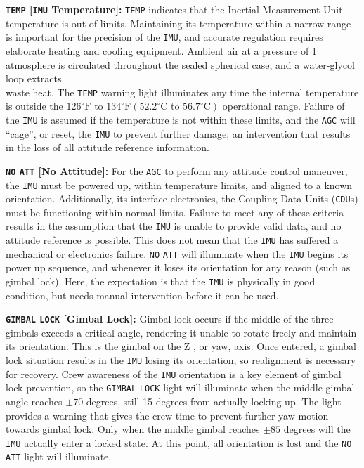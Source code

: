 \documentclass[refcap, oxford]{ahsan}
\begin{document}
\textbf{\texttt{TEMP} [\texttt{IMU} Temperature]:} \texttt{TEMP} indicates that the Inertial Measurement Unit temperature is out of limits. Maintaining its temperature within a narrow range is important for the precision of the \texttt{IMU}, and accurate regulation requires elaborate heating and cooling equipment. Ambient air at a pressure of 1 atmosphere is circulated throughout the sealed spherical case, and a water-glycol loop extracts\\
waste heat. The \texttt{TEMP} warning light illuminates any time the internal temperature is outside the $126^{\circ} \mathrm{F}$ to $134^{\circ} \mathrm{F}\left(52.2^{\circ} \mathrm{C}\right.$ to $\left.56.7^{\circ} \mathrm{C}\right)$ operational range. Failure of the \texttt{IMU} is assumed if the temperature is not within these limits, and the \texttt{AGC} will ``cage'', or reset, the \texttt{IMU} to prevent further damage; an intervention that results in the loss of all attitude reference information.

\textbf{\texttt{NO} \texttt{ATT} [No Attitude]:} For the \texttt{AGC} to perform any attitude control maneuver, the \texttt{IMU} must be powered up, within temperature limits, and aligned to a known orientation. Additionally, its interface electronics, the Coupling Data Units (\texttt{CDU}s) must be functioning within normal limits. Failure to meet any of these criteria results in the assumption that the \texttt{IMU} is unable to provide valid data, and no attitude reference is possible. This does not mean that the \texttt{IMU} has suffered a mechanical or electronics failure. \texttt{NO} \texttt{ATT} will illuminate when the \texttt{IMU} begins its power up sequence, and whenever it loses its orientation for any reason (such as gimbal lock). Here, the expectation is that the \texttt{IMU} is physically in good condition, but needs manual intervention before it can be used.

\textbf{\texttt{GIMBAL} \texttt{LOCK} [Gimbal Lock]:} Gimbal lock occurs if the middle of the three gimbals exceeds a critical angle, rendering it unable to rotate freely and maintain its orientation. This is the gimbal on the Z , or yaw, axis. Once entered, a gimbal lock situation results in the \texttt{IMU} losing its orientation, so realignment is necessary for recovery. Crew awareness of the \texttt{IMU} orientation is a key element of gimbal lock prevention, so the \texttt{GIMBAL} \texttt{LOCK} light will illuminate when the middle gimbal angle reaches $\pm 70$ degrees, still 15 degrees from actually locking up. The light provides a warning that gives the crew time to prevent further yaw motion towards gimbal lock. Only when the middle gimbal reaches $\pm 85$ degrees will the \texttt{IMU} actually enter a locked state. At this point, all orientation is lost and the \texttt{NO} \texttt{ATT} light will illuminate.
\end{document}
